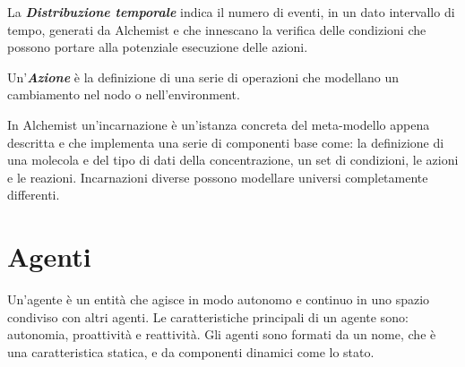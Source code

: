 \documentclass[12pt,a4paper,openright,twoside]{report}
\begin{document}
La \textbf{\textit{Distribuzione temporale}} indica il numero di eventi, in un dato intervallo di tempo, generati da Alchemist e che innescano la verifica delle condizioni che possono portare alla potenziale esecuzione delle azioni.

Un'\textbf{\textit{Azione}} \`e la definizione di una serie di operazioni che modellano un cambiamento nel nodo o nell'environment.

In Alchemist un'incarnazione \`e un'istanza concreta del meta-modello appena descritta e che implementa una serie di componenti base come: la definizione di una molecola e del tipo di dati della concentrazione, un set di condizioni, le azioni e le reazioni. Incarnazioni diverse possono modellare universi completamente differenti.

\chapter{Agenti}
\lhead[\fancyplain{}{\bfseries\thepage}]{\fancyplain{}{\bfseries\rightmark}}

Un'agente \`e un entit\`a che agisce in modo autonomo e continuo in uno spazio condiviso con altri agenti. Le caratteristiche principali di un agente sono: autonomia, proattivit\`a e reattivit\`a. Gli agenti sono formati da un nome, che \`e una caratteristica statica, e da componenti dinamici come lo stato.

%
%
%
%
\end{document}
